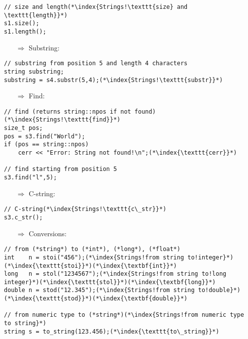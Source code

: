 \documentclass[10pt]{article}
\begin{document}
\begin{lstlisting}
// size and length(*\index{Strings!\texttt{size} and \texttt{length}}*)
s1.size();
s1.length();
\end{lstlisting}
\begin{enumerate}
\item[$\Rightarrow$] Substring:
\end{enumerate}
\begin{lstlisting}
// substring from position 5 and length 4 characters
string substring;
substring = s4.substr(5,4);(*\index{Strings!\texttt{substr}}*)
\end{lstlisting}
\begin{enumerate}
\item[$\Rightarrow$] Find:
\end{enumerate}
\begin{lstlisting}
// find (returns string::npos if not found)(*\index{Strings!\texttt{find}}*)
size_t pos;
pos = s3.find("World");
if (pos == string::npos)
    cerr << "Error: String not found!\n";(*\index{\texttt{cerr}}*)

// find starting from position 5
s3.find("l",5);
\end{lstlisting}
\begin{enumerate}
\item[$\Rightarrow$] C-string:
\end{enumerate}
\begin{lstlisting}
// C-string(*\index{Strings!\texttt{c\_str}}*)
s3.c_str();
\end{lstlisting}
\begin{enumerate}
\item[$\Rightarrow$] Conversions:
\end{enumerate}
\begin{lstlisting}
// from (*string*) to (*int*), (*long*), (*float*)
int    n = stoi("456");(*\index{Strings!from string to!integer}*)(*\index{\texttt{stoi}}*)(*\index{\textbf{int}}*)
long   n = stol("1234567");(*\index{Strings!from string to!long integer}*)(*\index{\texttt{stol}}*)(*\index{\textbf{long}}*)
double n = stod("12.345");(*\index{Strings!from string to!double}*)(*\index{\texttt{stod}}*)(*\index{\textbf{double}}*)

// from numeric type to (*string*)(*\index{Strings!from numeric type to string}*)
string s = to_string(123.456);(*\index{\texttt{to\_string}}*)
\end{lstlisting}
%
%
\end{document}
